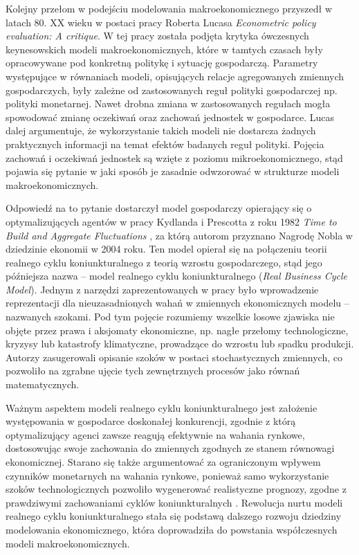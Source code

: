 Kolejny przełom w podejściu modelowania makroekonomicznego przyszedł w latach 80. XX wieku w postaci pracy Roberta Lucasa \emph{Econometric policy evaluation: A critique}\cite{LUCAS197619}. W tej pracy została podjęta krytyka ówczesnych keynesowskich modeli makroekonomicznych, które w tamtych czasach były opracowywane pod konkretną politykę i sytuację gospodarczą. Parametry występujące w równaniach modeli, opisujących relacje agregowanych zmiennych gospodarczych, były zależne od zastosowanych reguł polityki gospodarczej np. polityki monetarnej. Nawet drobna zmiana w zastosowanych regułach mogła spowodować zmianę oczekiwań oraz zachowań jednostek w gospodarce. Lucas dalej argumentuje, że wykorzystanie takich modeli nie dostarcza żadnych praktycznych informacji na temat efektów badanych reguł polityki. Pojęcia zachowań i oczekiwań jednostek są wzięte z poziomu mikroekonomicznego, stąd pojawia się pytanie w jaki sposób je zasadnie odwzorować w strukturze modeli makroekonomicznych.

Odpowiedź na to pytanie dostarczył model gospodarczy opierający się o optymalizujących agentów w pracy Kydlanda i Prescotta z roku 1982 \emph{Time to Build and Aggregate Fluctuations} \cite{prescott_kydland}, za którą autorom przyznano Nagrodę Nobla w dziedzinie ekonomii w 2004 roku. Ten model opierał się na połączeniu teorii realnego cyklu koniunkturalnego z teorią wzrostu gospodarczego, stąd jego późniejsza nazwa -- model realnego cyklu koniunkturalnego (\emph{Real Business Cycle Model}). Jednym z narzędzi zaprezentowanych w pracy było wprowadzenie reprezentacji dla nieuzasadnionych wahań w zmiennych ekonomicznych modelu -- nazwanych szokami. Pod tym pojęcie rozumiemy wszelkie losowe zjawiska nie objęte przez prawa i aksjomaty ekonomiczne, np. nagłe przełomy technologiczne, kryzysy lub  katastrofy klimatyczne, prowadzące do wzrostu lub spadku produkcji. Autorzy zasugerowali opisanie szoków w postaci stochastycznych zmiennych, co pozwoliło na zgrabne ujęcie tych zewnętrznych procesów jako równań matematycznych. 

Ważnym aspektem modeli realnego cyklu koniunkturalnego jest założenie występowania w gospodarce doskonałej konkurencji, zgodnie z którą optymalizujący agenci zawsze reagują efektywnie na wahania rynkowe, dostosowując swoje zachowania do zmiennych zgodnych ze stanem równowagi ekonomicznej. Starano się także argumentować za ograniczonym wpływem czynników monetarnych na wahania rynkowe, ponieważ samo wykorzystanie szoków technologicznych pozwoliło wygenerować realistyczne prognozy, zgodne z prawdziwymi zachowaniami cyklów koniunkturalnych \cite{gali}. Rewolucja nurtu modeli realnego cyklu koniunkturalnego stała się podstawą dalszego rozwoju dziedziny modelowania ekonomicznego, która doprowadziła do powstania współczesnych modeli makroekonomicznych. 

